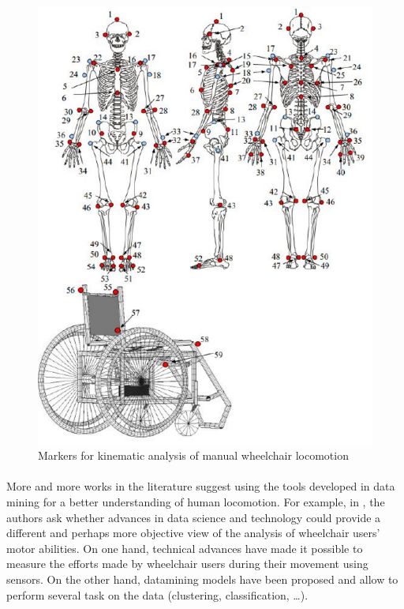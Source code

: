 \begin{itemize}
\begin{figure}[h]
\center
\includegraphics[scale = 0.5]{images/squelette}
\caption{Markers for kinematic analysis of manual wheelchair locomotion\cite{Sauret2010}}
\label{Wheelchair_model2}
\end{figure}

\end{itemize}


\paragraph{} More and more works in the literature suggest using the tools developed in data mining for a better understanding of human locomotion. For example, in \cite{van2017future}, the authors ask whether advances in data science and technology could provide a different and perhaps more objective view of the analysis of wheelchair users' motor abilities. On one hand, technical advances have made it possible to measure the efforts made by wheelchair users during their movement using sensors. On the other hand, datamining models have been proposed and allow to perform several task on the data (clustering, classification, …). 

